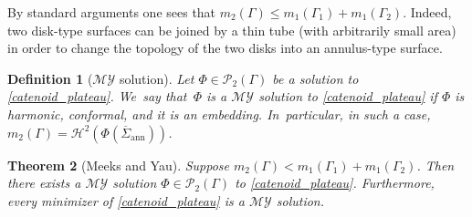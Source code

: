 \documentclass[JEP,XML,SOM,Unicode, NoFloatCountersInSection,published]{cedram}
\newcommand{\immclosedann}{\Phi({\overline\Sigma}_\mathrm{ann})}
\newtheorem{theorem}{Theorem}[section]
\newtheorem{definition}[theorem]{Definition}
\theoremstyle{definition}
\begin{document}
By standard arguments one sees that $m_2(\Gamma)\le m_1(\Gamma_1)+m_1(\Gamma_2)$. Indeed, two disk-type surfaces can be joined by a thin tube (with arbitrarily small area) in order to change the topology of the two disks into an annulus-type surface.

\begin{definition}[$\mathcal{MY}$ solution]\label{def:MY_solution}
Let $\Phi\in\mathcal{P}_2(\Gamma)$ be a solution to \eqref{catenoid_plateau}. We~say that~$\Phi$ is a $\mathcal{MY}$ solution to \eqref{catenoid_plateau} if
$\Phi$ is harmonic, conformal, and it is an embedding. In~particular, in such a case, $m_2(\Gamma)=\mathcal{H}^2(\immclosedann)$.
\end{definition}
\begin{theorem}[Meeks and Yau]\label{myexistence}
Suppose $m_2(\Gamma)<m_1(\Gamma_1)+m_1(\Gamma_2)$. Then there exists a $\mathcal{MY}$ solution $\Phi\in\mathcal{P}_2(\Gamma)$ to \eqref{catenoid_plateau}. Furthermore, every minimizer of \eqref{catenoid_plateau} is a $\mathcal{MY}$ solution.
\end{theorem}
\end{document}

